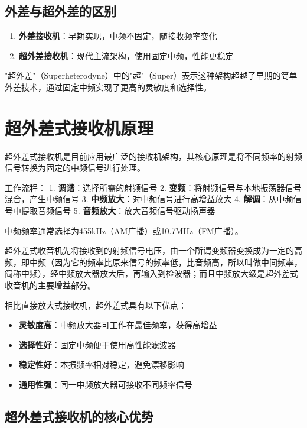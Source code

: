 \subsection{外差与超外差的区别}

\begin{enumerate}
    \item \textbf{外差接收机}：早期实现，中频不固定，随接收频率变化
    \item \textbf{超外差接收机}：现代主流架构，使用固定中频，性能更稳定
\end{enumerate}

"超外差"（Superheterodyne）中的"超"（Super）表示这种架构超越了早期的简单外差技术，通过固定中频实现了更高的灵敏度和选择性。

\section{超外差式接收机原理}
\label{sec:superheterodyne_principle}

超外差式接收机是目前应用最广泛的接收机架构，其核心原理是将不同频率的射频信号转换为固定的中频信号进行处理。

工作流程：
1. \textbf{调谐}：选择所需的射频信号
2. \textbf{变频}：将射频信号与本地振荡器信号混合，产生中频信号
3. \textbf{中频放大}：对中频信号进行高增益放大
4. \textbf{解调}：从中频信号中提取音频信号
5. \textbf{音频放大}：放大音频信号驱动扬声器

中频频率通常选择为455kHz（AM广播）或10.7MHz（FM广播）。

超外差式收音机先将接收到的射频信号电压，由一个所谓变频器变换成为一定的高频，即中频（因为它的频率比原来信号的频率低，比音频高，所以叫做中间频率，简称中频），经中频放大器放大后，再输入到检波器；而且中频放大级是超外差式收音机的主要增益部分。

相比直接放大式接收机，超外差式具有以下优点：

\begin{itemize}
    \item \textbf{灵敏度高}：中频放大器可工作在最佳频率，获得高增益
    \item \textbf{选择性好}：固定中频便于使用高性能滤波器
    \item \textbf{稳定性好}：本振频率相对稳定，避免漂移影响
    \item \textbf{通用性强}：同一中频放大器可接收不同频率信号
\end{itemize}

\subsection{超外差式接收机的核心优势}

